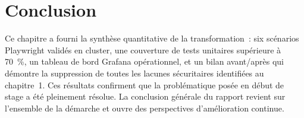 \section*{Conclusion}

Ce chapitre a fourni la synthèse quantitative de la transformation~: six scénarios Playwright
validés en cluster, une couverture de tests unitaires supérieure à 70~\%, un tableau de bord
Grafana opérationnel, et un bilan avant/après qui démontre la suppression de toutes les lacunes
sécuritaires identifiées au chapitre~1. Ces résultats confirment que la problématique posée
en début de stage a été pleinement résolue. La conclusion générale du rapport revient sur
l'ensemble de la démarche et ouvre des perspectives d'amélioration continue.

